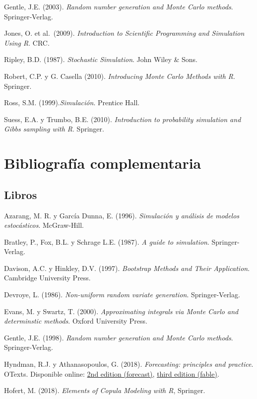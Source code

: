 \documentclass[
]{book}
\theoremstyle{break}
\theoremstyle{nonumberplain}
\begin{document}
Gentle, J.E. (2003). \emph{Random number generation and Monte Carlo methods}. Springer‐Verlag.

Jones, O. et al.~(2009). \emph{Introduction to Scientific Programming and Simulation Using R}. CRC.

Ripley, B.D. (1987). \emph{Stochastic Simulation}. John Wiley \& Sons.

Robert, C.P. y G. Casella (2010). \emph{Introducing Monte Carlo Methods with R}. Springer.

Ross, S.M. (1999).\emph{Simulación}. Prentice Hall.

Suess, E.A. y Trumbo, B.E. (2010). \emph{Introduction to probability simulation and Gibbs sampling with R}. Springer.

\hypertarget{bibliografuxeda-complementaria}{%
\section*{Bibliografía complementaria}\label{bibliografuxeda-complementaria}}

\hypertarget{libros}{%
\subsection*{Libros}\label{libros}}

Azarang, M. R. y García Dunna, E. (1996). \emph{Simulación y análisis de modelos estocásticos}. McGraw-Hill.

Bratley, P., Fox, B.L. y Schrage L.E. (1987). \emph{A guide to simulation}. Springer-Verlag.

Davison, A.C. y Hinkley, D.V. (1997). \emph{Bootstrap Methods and Their Application}. Cambridge University Press.

Devroye, L. (1986). \emph{Non-uniform random variate generation}. Springer-Verlag.

Evans, M. y Swartz, T. (2000). \emph{Approximating integrals via Monte Carlo and determinstic methods}. Oxford University Press.

Gentle, J.E. (1998). \emph{Random number generation and Monte Carlo methods}. Springer-Verlag.

Hyndman, R.J. y Athanasopoulos, G. (2018). \emph{Forecasting: principles and practice}. OTexts.
Disponible online: \href{https://otexts.com/fpp2}{2nd edition (forecast)}, \href{https://otexts.com/fpp3}{third edition (fable)}.

Hofert, M. (2018). \emph{Elements of Copula Modeling with R}, Springer.
\end{document}

